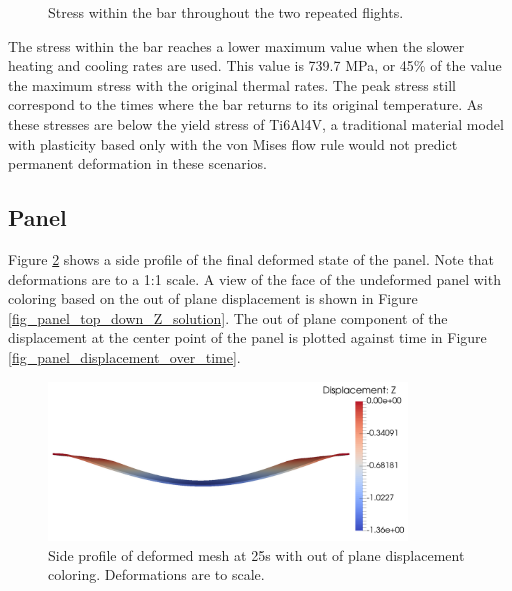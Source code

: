 \documentclass[conf]{new-aiaa}
\begin{document}
\begin{figure}[H]
  \centering
  \caption{ Stress within the bar throughout the two repeated flights.}
  \label{fig_slow_full_bar_stress}
\end{figure}

The stress within the bar reaches a lower maximum value 
when the slower heating and cooling rates are used.
This value is 739.7 MPa, or 45\% of the value
the maximum stress with the original thermal rates.
The peak stress still correspond to the times where
the bar returns to its original temperature.
As these stresses are below the yield stress of Ti6Al4V, 
a traditional material model with plasticity based only with the
von Mises flow rule would not predict permanent deformation 
in these scenarios.

\subsection{Panel}
Figure \ref{fig_panel_side_profile_Z_solution} 
shows a side profile of the final deformed
state of the panel. Note that deformations are to a 1:1 scale.
A view of the face of the undeformed panel with coloring based on the 
out of plane displacement is shown in Figure \ref{fig_panel_top_down_Z_solution}.
The out of plane component of the displacement at the center point 
of the panel is plotted against time in Figure \ref{fig_panel_displacement_over_time}.

\begin{figure}[H] 
  \centering
    \includegraphics[width=0.85\textwidth, keepaspectratio]
    {panel_side_profile_Z_solution}
  \caption{ Side profile of deformed mesh at 25s with out of plane displacement coloring.
            Deformations are to scale.}
  \label{fig_panel_side_profile_Z_solution}
\end{figure}
\end{document}

